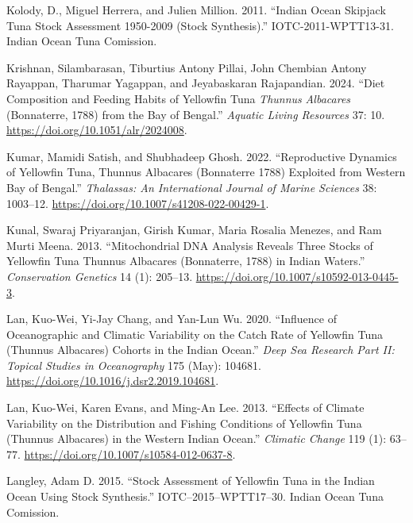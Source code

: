 \documentclass[
]{scrartcl}
\newlength{\cslhangindent}
\newenvironment{CSLReferences}[2] %
 {\begin{list}{}{%
  \setlength{\itemindent}{0pt}
  \setlength{\leftmargin}{0pt}
  \setlength{\parsep}{0pt}
  \ifodd #1
   \setlength{\leftmargin}{\cslhangindent}
   \setlength{\itemindent}{-1\cslhangindent}
  \fi
  \setlength{\itemsep}{#2\baselineskip}}}
 {\end{list}}
\begin{document}
\begin{CSLReferences}{1}{0}
Kolody, D., Miguel Herrera, and Julien Million. 2011. {``Indian {Ocean
Skipjack Tuna Stock Assessment} 1950-2009 ({Stock Synthesis}).''}
IOTC-2011-WPTT13-31. Indian Ocean Tuna Comission.

Krishnan, Silambarasan, Tiburtius Antony Pillai, John Chembian Antony
Rayappan, Tharumar Yagappan, and Jeyabaskaran Rajapandian. 2024. {``Diet
Composition and Feeding Habits of Yellowfin Tuna {\emph{Thunnus}}{
\emph{Albacares}} ({Bonnaterre}, 1788) from the {Bay} of {Bengal}.''}
\emph{Aquatic Living Resources} 37: 10.
\url{https://doi.org/10.1051/alr/2024008}.

Kumar, Mamidi Satish, and Shubhadeep Ghosh. 2022. {``Reproductive
{Dynamics} of {Yellowfin Tuna}, {Thunnus} Albacares ({Bonnaterre} 1788)
{Exploited} from {Western Bay} of {Bengal}.''} \emph{Thalassas: An
International Journal of Marine Sciences} 38: 1003--12.
\url{https://doi.org/10.1007/s41208-022-00429-1}.

Kunal, Swaraj Priyaranjan, Girish Kumar, Maria Rosalia Menezes, and Ram
Murti Meena. 2013. {``Mitochondrial {DNA} Analysis Reveals Three Stocks
of Yellowfin Tuna {Thunnus} Albacares ({Bonnaterre}, 1788) in {Indian}
Waters.''} \emph{Conservation Genetics} 14 (1): 205--13.
\url{https://doi.org/10.1007/s10592-013-0445-3}.

Lan, Kuo-Wei, Yi-Jay Chang, and Yan-Lun Wu. 2020. {``Influence of
Oceanographic and Climatic Variability on the Catch Rate of Yellowfin
Tuna ({Thunnus} Albacares) Cohorts in the {Indian Ocean}.''} \emph{Deep
Sea Research Part II: Topical Studies in Oceanography} 175 (May):
104681. \url{https://doi.org/10.1016/j.dsr2.2019.104681}.

Lan, Kuo-Wei, Karen Evans, and Ming-An Lee. 2013. {``Effects of Climate
Variability on the Distribution and Fishing Conditions of Yellowfin Tuna
({Thunnus} Albacares) in the Western {Indian Ocean}.''} \emph{Climatic
Change} 119 (1): 63--77.
\url{https://doi.org/10.1007/s10584-012-0637-8}.

Langley, Adam D. 2015. {``Stock Assessment of Yellowfin Tuna in the
{Indian Ocean} Using {Stock Synthesis}.''} IOTC--2015--WPTT17--30.
Indian Ocean Tuna Comission.


\end{CSLReferences}
\end{document}
